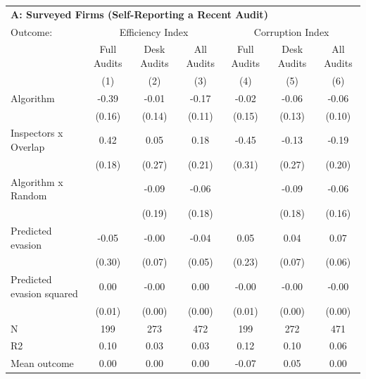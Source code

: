 \begin{tabular}{lccc|ccc} \toprule
\multicolumn{7}{l}{\textbf{A: Surveyed Firms (Self-Reporting a Recent Audit)}} \\ \multicolumn{1}{l}{Outcome:} & \multicolumn{3}{c}{Efficiency Index} & \multicolumn{3}{c}{Corruption Index} \\ \multicolumn{1}{l}{} & Full Audits & Desk Audits & All Audits & Full Audits & Desk Audits & All Audits \\ \multicolumn{1}{l}{} & (1) & (2) & (3) & (4) & (5) & (6) \\ \midrule
Algorithm   &       -0.39\sym{**} &       -0.01         &       -0.17\sym{*}  &       -0.02         &       -0.06         &       -0.06         \\
            &      (0.16)         &      (0.14)         &      (0.11)         &      (0.15)         &      (0.13)         &      (0.10)         \\
\addlinespace
Inspectors x Overlap&        0.42\sym{**} &        0.05         &        0.18         &       -0.45         &       -0.13         &       -0.19         \\
            &      (0.18)         &      (0.27)         &      (0.21)         &      (0.31)         &      (0.27)         &      (0.20)         \\
\addlinespace
Algorithm x Random&                     &       -0.09         &       -0.06         &                     &       -0.09         &       -0.06         \\
            &                     &      (0.19)         &      (0.18)         &                     &      (0.18)         &      (0.16)         \\
\addlinespace
Predicted evasion&       -0.05         &       -0.00         &       -0.04         &        0.05         &        0.04         &        0.07         \\
            &      (0.30)         &      (0.07)         &      (0.05)         &      (0.23)         &      (0.07)         &      (0.06)         \\
\addlinespace
Predicted evasion squared&        0.00         &       -0.00         &        0.00         &       -0.00         &       -0.00         &       -0.00\sym{*}  \\
            &      (0.01)         &      (0.00)         &      (0.00)         &      (0.01)         &      (0.00)         &      (0.00)         \\
\midrule
N           &         199         &         273         &         472         &         199         &         272         &         471         \\
R2          &        0.10         &        0.03         &        0.03         &        0.12         &        0.10         &        0.06         \\
Mean outcome&        0.00         &        0.00         &        0.00         &       -0.07         &        0.05         &        0.00         \\


\end{tabular}
